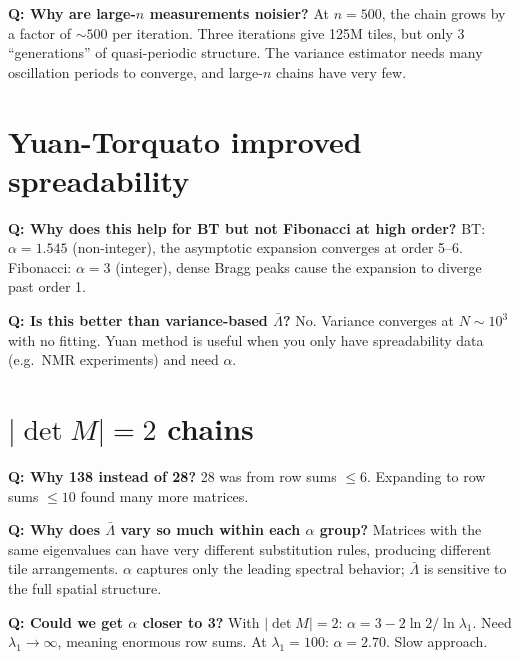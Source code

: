 \documentclass[11pt]{article}
\newcommand{\Q}[1]{\textcolor{qcolor}{\textbf{Q: #1}}}
\begin{document}
\Q{Why are large-$n$ measurements noisier?}
At $n = 500$, the chain grows by a factor of $\sim\!500$ per iteration.
Three iterations give 125M tiles, but only 3 ``generations'' of
quasi-periodic structure. The variance estimator needs many
oscillation periods to converge, and large-$n$ chains have very few.

\section{Yuan-Torquato improved spreadability}

\Q{Why does this help for BT but not Fibonacci at high order?}
BT: $\alpha = 1.545$ (non-integer), the asymptotic expansion
converges at order 5--6.
Fibonacci: $\alpha = 3$ (integer), dense Bragg peaks cause
the expansion to diverge past order 1.

\Q{Is this better than variance-based $\bar\Lambda$?}
No. Variance converges at $N \sim 10^3$ with no fitting.
Yuan method is useful when you only have spreadability data
(e.g.\ NMR experiments) and need $\alpha$.

\section{$|\det M|{=}2$ chains}

\Q{Why 138 instead of 28?}
28 was from row sums $\leq 6$. Expanding to row sums $\leq 10$
found many more matrices.

\Q{Why does $\bar\Lambda$ vary so much within each $\alpha$ group?}
Matrices with the same eigenvalues can have
very different substitution rules, producing different tile
arrangements. $\alpha$ captures only the leading spectral behavior;
$\bar\Lambda$ is sensitive to the full spatial structure.

\Q{Could we get $\alpha$ closer to 3?}
With $|\det M| = 2$: $\alpha = 3 - 2\ln 2/\ln\lambda_1$.
Need $\lambda_1 \to \infty$, meaning enormous row sums.
At $\lambda_1 = 100$: $\alpha = 2.70$. Slow approach.
\end{document}
